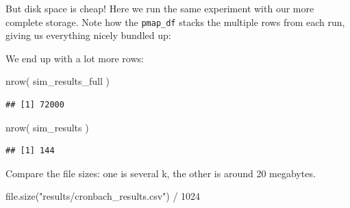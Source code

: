 \documentclass[
]{book}
\newenvironment{Shaded}{\begin{snugshade}}{\end{snugshade}}
\newcommand{\AttributeTok}[1]{\textcolor[rgb]{0.77,0.63,0.00}{#1}}
\newcommand{\DecValTok}[1]{\textcolor[rgb]{0.00,0.00,0.81}{#1}}
\newcommand{\FunctionTok}[1]{\textcolor[rgb]{0.00,0.00,0.00}{#1}}
\newcommand{\NormalTok}[1]{#1}
\newcommand{\OtherTok}[1]{\textcolor[rgb]{0.56,0.35,0.01}{#1}}
\newcommand{\SpecialCharTok}[1]{\textcolor[rgb]{0.00,0.00,0.00}{#1}}
\newcommand{\StringTok}[1]{\textcolor[rgb]{0.31,0.60,0.02}{#1}}
\begin{document}
But disk space is cheap!
Here we run the same experiment with our more
complete storage. Note how the \texttt{pmap\_df} stacks the
multiple rows from each run, giving us everything nicely bundled up:

\begin{Shaded}
\end{Shaded}

We end up with a lot more rows:

\begin{Shaded}
\begin{Highlighting}[]
\FunctionTok{nrow}\NormalTok{( sim\_results\_full )}
\end{Highlighting}
\end{Shaded}

\begin{verbatim}
## [1] 72000
\end{verbatim}

\begin{Shaded}
\begin{Highlighting}[]
\FunctionTok{nrow}\NormalTok{( sim\_results )}
\end{Highlighting}
\end{Shaded}

\begin{verbatim}
## [1] 144
\end{verbatim}

Compare the file sizes: one is several k, the other is around 20 megabytes.

\begin{Shaded}
\begin{Highlighting}[]
\FunctionTok{file.size}\NormalTok{(}\StringTok{"results/cronbach\_results.csv"}\NormalTok{) }\SpecialCharTok{/} \DecValTok{1024}
\end{Highlighting}
\end{Shaded}
\end{document}
